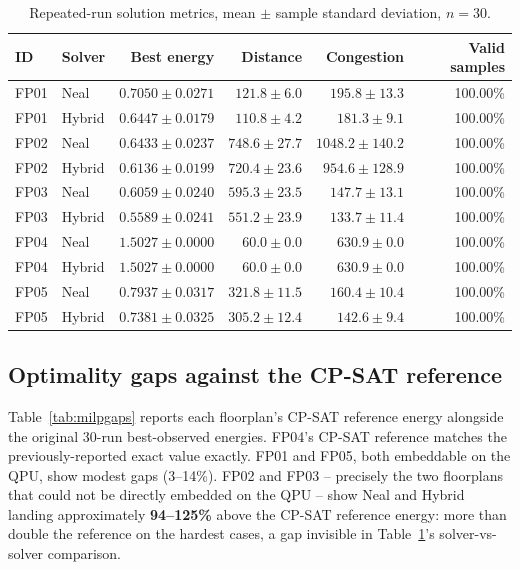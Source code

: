\documentclass[11pt]{article}
\begin{document}
\begin{table}[h]
\centering
\caption{Repeated-run solution metrics, mean $\pm$ sample standard deviation, $n=30$.}
\label{tab:meanquality}
\small
\begin{tabular}{llrrrr}
\toprule
ID & Solver & Best energy & Distance & Congestion & Valid samples \\
\midrule
FP01 & Neal & $0.7050 \pm 0.0271$ & $121.8 \pm 6.0$ & $195.8 \pm 13.3$ & 100.00\% \\
FP01 & Hybrid & $0.6447 \pm 0.0179$ & $110.8 \pm 4.2$ & $181.3 \pm 9.1$ & 100.00\% \\
FP02 & Neal & $0.6433 \pm 0.0237$ & $748.6 \pm 27.7$ & $1048.2 \pm 140.2$ & 100.00\% \\
FP02 & Hybrid & $0.6136 \pm 0.0199$ & $720.4 \pm 23.6$ & $954.6 \pm 128.9$ & 100.00\% \\
FP03 & Neal & $0.6059 \pm 0.0240$ & $595.3 \pm 23.5$ & $147.7 \pm 13.1$ & 100.00\% \\
FP03 & Hybrid & $0.5589 \pm 0.0241$ & $551.2 \pm 23.9$ & $133.7 \pm 11.4$ & 100.00\% \\
FP04 & Neal & $1.5027 \pm 0.0000$ & $60.0 \pm 0.0$ & $630.9 \pm 0.0$ & 100.00\% \\
FP04 & Hybrid & $1.5027 \pm 0.0000$ & $60.0 \pm 0.0$ & $630.9 \pm 0.0$ & 100.00\% \\
FP05 & Neal & $0.7937 \pm 0.0317$ & $321.8 \pm 11.5$ & $160.4 \pm 10.4$ & 100.00\% \\
FP05 & Hybrid & $0.7381 \pm 0.0325$ & $305.2 \pm 12.4$ & $142.6 \pm 9.4$ & 100.00\% \\
\bottomrule
\end{tabular}
\end{table}

\subsection{Optimality gaps against the CP-SAT reference}
\label{sec:gaps}
Table~\ref{tab:milpgaps} reports each floorplan's CP-SAT reference energy alongside the original 30-run best-observed energies. FP04's CP-SAT reference matches the previously-reported exact value exactly. FP01 and FP05, both embeddable on the QPU, show modest gaps (3--14\%). FP02 and FP03 -- precisely the two floorplans that could not be directly embedded on the QPU -- show Neal and Hybrid landing approximately \textbf{94--125\%} above the CP-SAT reference energy: more than double the reference on the hardest cases, a gap invisible in Table~\ref{tab:meanquality}'s solver-vs-solver comparison.
\end{document}
